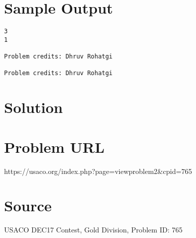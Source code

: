 \documentclass[12pt]{article}
\begin{document}
\section*{Sample Output}
\begin{verbatim}
3
1

Problem credits: Dhruv Rohatgi

Problem credits: Dhruv Rohatgi
\end{verbatim}

\section*{Solution}


\section*{Problem URL}
https://usaco.org/index.php?page=viewproblem2&cpid=765

\section*{Source}
USACO DEC17 Contest, Gold Division, Problem ID: 765
\end{document}
